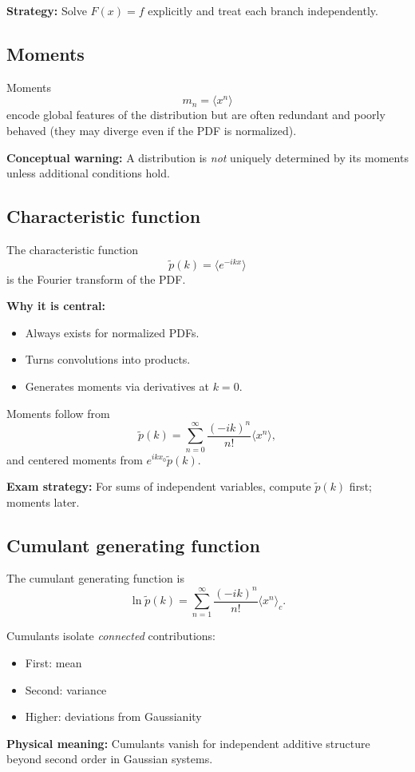 \documentclass[9pt,twocoloumn]{article}
\begin{document}
\textbf{Strategy:} Solve $F(x)=f$ explicitly and treat each branch independently.

\subsection*{Moments}
Moments
\[
m_n = \langle x^n \rangle
\]
encode global features of the distribution but are often redundant and poorly behaved (they may diverge even if the PDF is normalized).

\textbf{Conceptual warning:} A distribution is \emph{not} uniquely determined by its moments unless additional conditions hold.

\subsection*{Characteristic function}
The characteristic function
\[
\tilde p(k) = \langle e^{-ikx} \rangle
\]
is the Fourier transform of the PDF.

\textbf{Why it is central:}
\begin{itemize}
\item Always exists for normalized PDFs.
\item Turns convolutions into products.
\item Generates moments via derivatives at $k=0$.
\end{itemize}

Moments follow from
\[
\tilde p(k) = \sum_{n=0}^\infty \frac{(-ik)^n}{n!}\langle x^n\rangle,
\]
and centered moments from $e^{ikx_0}\tilde p(k)$.

\textbf{Exam strategy:} For sums of independent variables, compute $\tilde p(k)$ first; moments later.

\subsection*{Cumulant generating function}
The cumulant generating function is
\[
\ln \tilde p(k) = \sum_{n=1}^\infty \frac{(-ik)^n}{n!}\langle x^n\rangle_c.
\]

Cumulants isolate \emph{connected} contributions:
\begin{itemize}
\item First: mean
\item Second: variance
\item Higher: deviations from Gaussianity
\end{itemize}

\textbf{Physical meaning:} Cumulants vanish for independent additive structure beyond second order in Gaussian systems.
\end{document}
